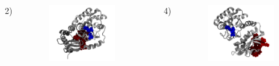\documentclass[english]{beamer}
\begin{document}
\begin{frame}
\begin{columns}[t]
        2)
        \vspace{-4ex}
        \begin{figure}
            \includegraphics[width=0.85\textwidth]{figures/Complex_structures/structure2.png}  
        \end{figure}      
        4)
        \vspace{-8ex}
        \begin{figure}
            \includegraphics[width=0.85\textwidth]{figures/Complex_structures/structure4.png}   
        \end{figure}       

    \end{columns}  


\end{frame}      
\end{document}
